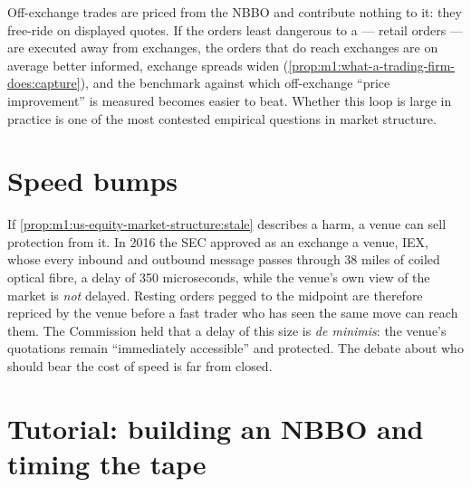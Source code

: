 \begin{remark}\label{rem:m1:us-equity-market-structure:free}
Off-exchange trades are priced from the NBBO and contribute nothing to it:
they free-ride on displayed quotes. If the orders least dangerous to a  --- retail orders --- are executed away from exchanges, the orders
that do reach exchanges are on average better informed, exchange spreads
widen (\cref{prop:m1:what-a-trading-firm-does:capture}), and the benchmark
against which off-exchange ``price improvement'' is measured becomes easier
to beat. Whether this loop is large in practice is one of the most contested
empirical questions in market structure.
\end{remark}

\section{Speed bumps}

If \cref{prop:m1:us-equity-market-structure:stale} describes a harm, a venue
can sell protection from it. In 2016 the SEC approved as an exchange a venue,
IEX, whose every inbound and outbound message passes through 38 miles of
coiled optical fibre, a delay of 350 microseconds, while the venue's own view
of the market is \emph{not} delayed. Resting orders pegged to the midpoint
are therefore repriced by the venue before a fast trader who has seen the
same move can reach them. The Commission held that a delay of this size is
\emph{de minimis}: the venue's quotations remain ``immediately accessible''
and protected. The debate about who should bear the cost of speed is far from
closed.

\section{Tutorial: building an NBBO and timing the tape}\label{tut:m1:us-equity-market-structure:nbbo}

